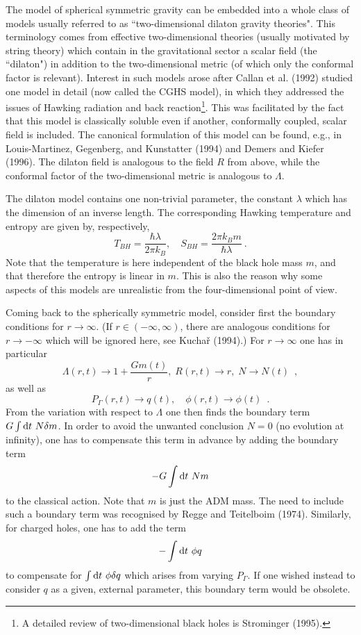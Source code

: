 \documentclass[12pt]{article}
\def\D{{\rm d}}
\newcommand{\be}{\begin{equation}}
\newcommand{\ee}{\end{equation}}
\begin{document}
The model of spherical symmetric gravity can be embedded into a
whole class of models usually referred to as ``two-dimensional
dilaton gravity theories". This terminology comes from effective
two-dimensional theories (usually motivated by string theory)
 which contain in the gravitational sector
 a scalar field (the ``dilaton") in addition to
the two-dimensional metric (of which only the conformal factor
is relevant). 
Interest in such models arose after Callan et al. (1992) studied
one model in detail (now called the CGHS model), in which they
addressed the issues of Hawking radiation
 and back reaction\footnote{A detailed review
 of two-dimensional black holes
is Strominger (1995).}.
This was facilitated by the fact that this model is classically
soluble even if another, conformally coupled, scalar field
is included. The canonical formulation of this model can be found,
e.g., in Louis-Martinez, Gegenberg, and Kunstatter (1994) and
Demers and Kiefer (1996). The dilaton field is analogous
to the field $R$ from above, while the conformal factor of the
two-dimensional metric is analogous to $\Lambda$.

\vskip 2mm
\small
The dilaton model contains one non-trivial parameter, the
constant $\lambda$ which has the dimension of an inverse length.
The corresponding Hawking temperature and entropy are given by,
respectively,
\[ T_{BH}=\frac{\hbar\lambda}{2\pi k_B},\quad
   S_{BH}=\frac{2\pi k_B m}{\hbar\lambda}\ . \]
Note that the temperature is here independent of the black hole
mass $m$, and that therefore the entropy is linear in $m$.
This is also the reason why some aspects of this models
are unrealistic from the four-dimensional point of view.

\vskip 2mm
\normalsize

Coming back to the spherically symmetric model, consider first
the boundary conditions for $r\to\infty$. (If $r\in(-\infty,\infty)$,
there are analogous conditions for $r\to-\infty$ which will be
ignored here, see Kucha\v{r} (1994).) For $r\to\infty$ one has
in particular
\be \Lambda(r,t)\to 1+\frac{Gm(t)}{r},\; R(r,t)\to r,\;
    N\to N(t) \enspace, \ee
as well as
\be P_{\Gamma}(r,t)\to q(t), \quad \phi(r,t)\to \phi(t) \enspace .\ee
{}From the variation with respect to $\Lambda$ one then finds the
boundary term \\ $G\int \D t\ N\delta m$. In order to avoid the unwanted
conclusion $N=0$ (no evolution at infinity), one has to
compensate this term in advance by adding the boundary term
\[ -G\int\D t\ Nm \]
to the classical action. Note that $m$ is just the ADM mass.
The need to include such a boundary term was recognised by
Regge and Teitelboim (1974).
Similarly, for charged holes, one has to add the term
\[ -\int\D t\ \phi q \]
to compensate for $\int \D t\ \phi\delta q$ which arises from
varying $P_{\Gamma}$. If one wished instead to consider $q$ as a given,
external parameter, this boundary term would be obsolete.
\end{document}
